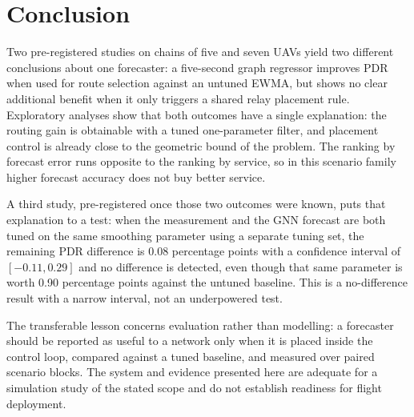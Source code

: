 \documentclass[11pt,a4paper]{article}
\begin{document}
\section{Conclusion}
Two pre-registered studies on chains of five and seven UAVs yield two different
conclusions about one forecaster: a five-second graph regressor improves PDR
when used for route selection against an untuned EWMA, but shows no clear
additional benefit when it only triggers a shared relay placement rule.
Exploratory analyses show that both outcomes have a single explanation: the
routing gain is obtainable with a tuned one-parameter filter, and placement
control is already close to the geometric bound of the problem. The ranking by
forecast error runs opposite to the ranking by service, so in this scenario
family higher forecast accuracy does not buy better service.

A third study, pre-registered once those two outcomes were known, puts that
explanation to a test: when the measurement and the GNN forecast are both tuned
on the same smoothing parameter using a separate tuning set, the remaining PDR
difference is 0.08 percentage points with a confidence interval of
$[-0.11, 0.29]$ and no difference is detected, even though that same parameter
is worth 0.90 percentage points against the untuned baseline. This is a
no-difference result with a narrow interval, not an underpowered test.

The transferable lesson concerns evaluation rather than modelling: a forecaster
should be reported as useful to a network only when it is placed inside the
control loop, compared against a tuned baseline, and measured over paired
scenario blocks. The system and evidence presented here are adequate for a
simulation study of the stated scope and do not establish readiness for flight
deployment.
\end{document}
